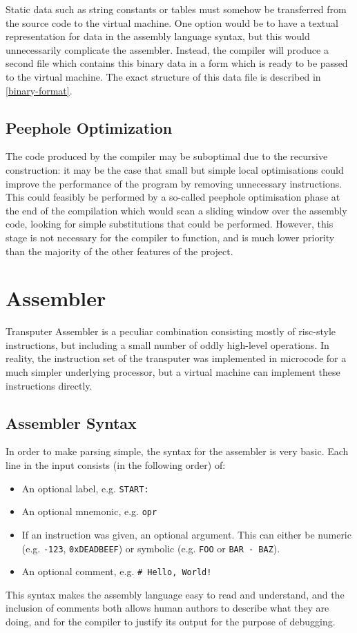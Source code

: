 Static data such as string constants or tables must somehow be transferred from
the source code to the virtual machine. One option would be to have a textual
representation for data in the assembly language syntax, but this would
unnecessarily complicate the assembler. Instead, the compiler will produce a
second file which contains this binary data in a form which is ready to be
passed to the virtual machine. The exact structure of this data file is
described in \ref{binary-format}.

\subsection{Peephole Optimization}

The code produced by the compiler may be suboptimal due to the recursive
construction: it may be the case that small but simple local optimisations could
improve the performance of the program by removing unnecessary instructions.
This could feasibly be performed by a so-called peephole optimisation phase at
the end of the compilation which would scan a sliding window over the assembly
code, looking for simple substitutions that could be performed. However, this
stage is not necessary for the compiler to function, and is much lower priority
than the majority of the other features of the project.

\section{Assembler}

Transputer Assembler is a peculiar combination consisting mostly of
\gls{risc}-style instructions, but including a small number of oddly high-level
operations. In reality, the instruction set of the transputer was implemented in
microcode for a much simpler underlying processor, but a virtual machine can
implement these instructions directly.

\subsection{Assembler Syntax}

In order to make parsing simple, the syntax for the assembler is very basic.
Each line in the input consists (in the following order) of:
\begin{itemize}
  \item An optional label, e.g. \texttt{START:}
  \item An optional \gls{mnemonic}, e.g. \texttt{opr}
  \item If an instruction was given, an optional argument. This can either be
        numeric (e.g. \texttt{-123}, \texttt{0xDEADBEEF}) or symbolic
        (e.g. \texttt{FOO} or \texttt{BAR - BAZ}).
  \item An optional comment, e.g. \texttt{\# Hello, World!}
\end{itemize}
This syntax makes the assembly language easy to read and understand, and the
inclusion of comments both allows human authors to describe what they are doing,
and for the compiler to justify its output for the purpose of debugging.

